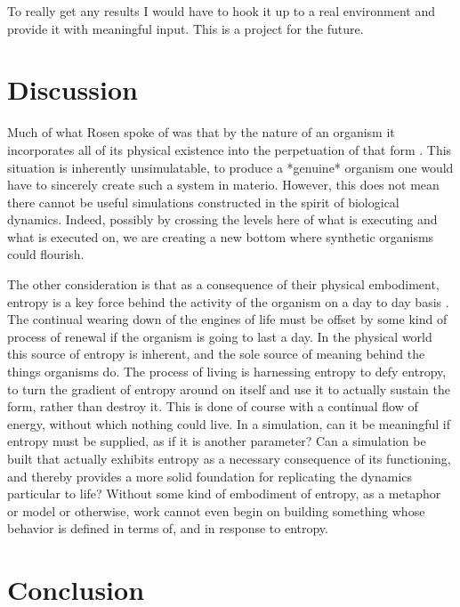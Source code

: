 \documentclass[12pt]{article}
\begin{document}
To really get any results I would have to hook it up to a real environment and provide it with meaningful input.  This is a project for the future.

\section{Discussion}

Much of what Rosen spoke of was that by the nature of an organism it incorporates all of its physical existence into the perpetuation of that form \cite{Alon}.  This situation is inherently unsimulatable, to produce a *genuine* organism one would have to sincerely create such a system in materio.  However, this does not mean there cannot be useful simulations constructed in the spirit of biological dynamics.  Indeed, possibly by crossing the levels here of what is executing and what is executed on, we are creating a new bottom where synthetic organisms could flourish.  

The other consideration is that as a consequence of their physical embodiment, entropy is a key force behind the activity of the organism on a day to day basis \cite{Ho}.  The continual wearing down of the engines of life must be offset by some kind of process of renewal if the organism is going to last a day.  In the physical world this source of entropy is inherent, and the sole source of meaning behind the things organisms do.  The process of living is harnessing entropy to defy entropy, to turn the gradient of entropy around on itself and use it to actually sustain the form, rather than destroy it.  This is done of course with a continual flow of energy, without which nothing could live.  In a simulation, can it be meaningful if entropy must be supplied, as if it is another parameter?  Can a simulation be built that actually exhibits entropy as a necessary consequence of its functioning, and thereby provides a more solid foundation for replicating the dynamics particular to life?  Without some kind of embodiment of entropy, as a metaphor or model or otherwise, work cannot even begin on building something whose behavior is defined in terms of, and in response to entropy.

\section{Conclusion}
\end{document}
